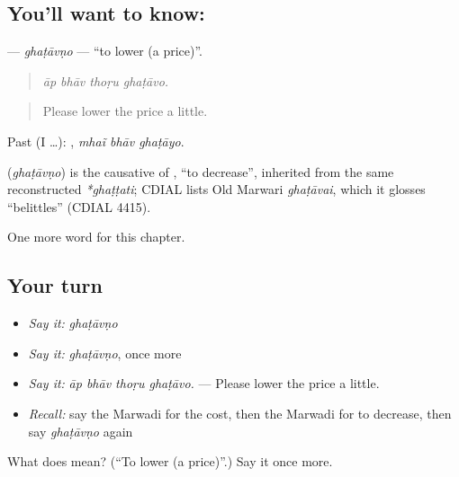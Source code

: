 \subsection*{You'll want to know: }
\textbf{} — \emph{ghaṭāvṇo} — \textquotedblleft{}to lower (a price)\textquotedblright{}.

\begin{quote}
   
\end{quote}

\begin{quote}
\emph{āp bhāv thoṛu ghaṭāvo.}
\end{quote}

\begin{quote}
Please lower the price a little.
\end{quote}

Past (I …):   , \emph{mhaĩ bhāv ghaṭāyo}.

\begin{cousinweb}
\textbf{} (\emph{ghaṭāvṇo}) is the causative of \textbf{}, \textquotedblleft{}to decrease\textquotedblright{}, inherited from the same reconstructed \emph{*ghaṭṭati}; CDIAL lists Old Marwari \emph{ghaṭāvai}, which it glosses \textquotedblleft{}belittles\textquotedblright{} (CDIAL 4415).
\end{cousinweb}

\begin{grammarlens}[title={What you've built}]
One more word for this chapter.
\end{grammarlens}

\subsection*{Your turn}
\begin{itemize}
\raggedright
  \item \emph{Say it:} \emph{ghaṭāvṇo}
  \item \emph{Say it:} \emph{ghaṭāvṇo}, once more
  \item \emph{Say it:} \emph{āp bhāv thoṛu ghaṭāvo.} — Please lower the price a little.
  \item \emph{Recall:} say the Marwadi for the cost, then the Marwadi for to decrease, then say \emph{ghaṭāvṇo} again
\end{itemize}

\begin{tcolorbox}[breakable,colback=teal!4,colframe=teal!35!black,title={Before you move on}]
What does  mean? (\textquotedblleft{}To lower (a price)\textquotedblright{}.) Say it once more.
\end{tcolorbox}

